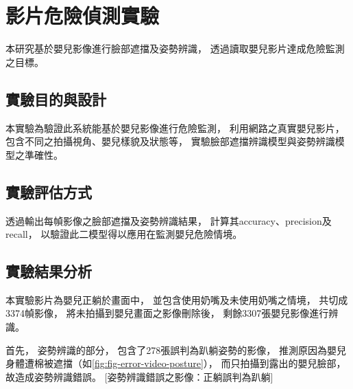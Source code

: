 \documentclass[class=NCU_thesis, crop=false]{standalone}
\begin{document}

\section{影片危險偵測實驗}
本研究基於嬰兒影像進行臉部遮擋及姿勢辨識，
透過讀取嬰兒影片達成危險監測之目標。

\subsection{實驗目的與設計}
本實驗為驗證此系統能基於嬰兒影像進行危險監測，
利用網路之真實嬰兒影片，
包含不同之拍攝視角、嬰兒樣貌及狀態等，
實驗臉部遮擋辨識模型與姿勢辨識模型之準確性。

\subsection{實驗評估方式}
透過輸出每幀影像之臉部遮擋及姿勢辨識結果，
計算其accuracy、precision及recall，
以驗證此二模型得以應用在監測嬰兒危險情境。

\subsection{實驗結果分析}
本實驗影片為嬰兒正躺於畫面中，
並包含使用奶嘴及未使用奶嘴之情境，
共切成3374幀影像，
將未拍攝到嬰兒畫面之影像刪除後，
剩餘3307張嬰兒影像進行辨識。

首先，
姿勢辨識的部分，
包含了278張誤判為趴躺姿勢的影像，
推測原因為嬰兒身體遭棉被遮擋（如\cref{fig:fig-error-video-posture}），
而只拍攝到露出的嬰兒臉部，
故造成姿勢辨識錯誤。
[姿勢辨識錯誤之影像：正躺誤判為趴躺]
\end{document}
